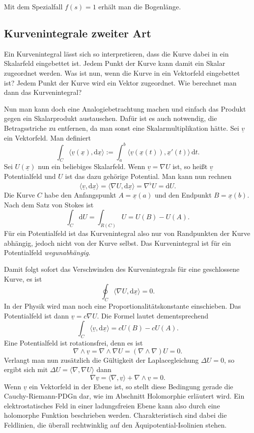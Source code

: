 \documentclass[a4paper,10pt,fleqn,twocolumn,twoside]{article}
\begin{document}
Mit dem Spezialfall \(f(s)=1\) erhält
man die Bogenlänge.



\subsection{Kurvenintegrale zweiter Art}

Ein Kurvenintegral lässt sich so interpretieren, dass die Kurve
dabei in ein Skalarfeld eingebettet ist. Jedem Punkt der Kurve
kann damit ein Skalar zugeordnet werden. Was ist nun, wenn die
Kurve in ein Vektorfeld eingebettet ist? Jedem Punkt der Kurve
wird ein Vektor zugeordnet. Wie berechnet man dann das Kurvenintegral?

Nun man kann doch eine Analogiebetrachtung machen und einfach das
Produkt gegen ein Skalarprodukt austauschen. Dafür ist es auch
notwendig, die Betragsstriche zu entfernen, da man sonst eine
Skalarmultiplikation hätte. Sei \(\underline v\) ein Vektorfeld.
Man definiert
\[\int_C \langle\underline v(\underline x),\mathrm d\underline x\rangle
:= \int_{a}^{b} \langle\underline v(\underline x(t)),
\underline x'(t)\rangle\,\mathrm dt.\]
Sei \(U(\underline x)\) nun ein beliebiges Skalarfeld. Wenn
\(\underline v=\nabla U\) ist, so heißt \(\underline v\) Potentialfeld
und \(U\) ist das dazu gehörige Potential. Man kann nun rechnen
\[\langle\underline v,\mathrm d\underline x\rangle
= \langle\nabla U,\mathrm d\underline x\rangle
= \nabla^\flat U
= \mathrm dU.\]
Die Kurve \(C\) habe den Anfangspunkt \(A=\underline x(a)\) und den
Endpunkt \(B=\underline x(b)\). Nach dem Satz von Stokes ist
\[\int_C \mathrm dU = \int_{R(C)} U = U(B)-U(A).\]
Für ein Potentialfeld ist das Kurvenintegral also nur von Randpunkten
der Kurve abhängig, jedoch nicht von der Kurve selbst. Das Kurvenintegral
ist für ein Potentialfeld \textit{wegunabhängig}.

Damit folgt sofort das Verschwinden des Kurvenintegrals für eine
geschlossene Kurve, es ist
\[\oint_C \langle\nabla U,\mathrm d\underline x\rangle = 0.\]
In der Physik wird man noch eine Proportionalitätskonstante einschieben.
Das Potentialfeld ist dann \(\underline v=c\nabla U\).
Die Formel lautet dementsprechend
\[\int_C \langle\underline v,\mathrm d\underline x\rangle
= cU(B)-cU(A).\]
Eine Potentialfeld ist rotationsfrei, denn es ist
\[\nabla\wedge\underline v = \nabla\wedge \nabla U
= (\nabla\wedge\nabla)U = 0.\]
Verlangt man nun zusätzlich die Gültigkeit der Laplacegleichung
\(\Delta U = 0\), so ergibt sich mit
\(\Delta U = \langle\nabla,\nabla U\rangle\) dann
\[\nabla\underline v
= \langle\nabla,\underline v\rangle + \nabla\wedge\underline v=0.\]
Wenn \(\underline v\) ein Vektorfeld in der Ebene ist, so
stellt diese Bedingung gerade die Cauchy-Riemann-PDGn dar, wie
im Abschnitt Holomorphie erläutert wird. Ein elektrostatisches
Feld in einer ladungsfreien Ebene kann also durch eine holomorphe
Funktion beschrieben werden. Charakteristisch sind dabei die
Feldlinien, die überall rechtwinklig auf den Äquipotential-Isolinien
stehen.
\end{document}
